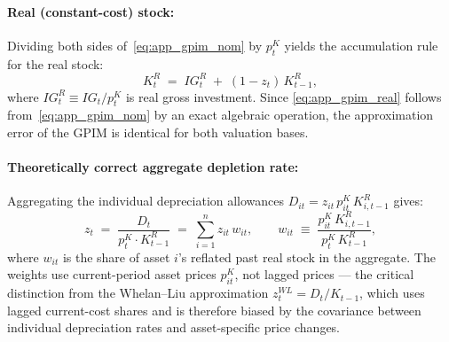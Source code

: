 \paragraph{Real (constant-cost) stock:}
Dividing both sides of~\eqref{eq:app_gpim_nom} by $p_t^{K}$ yields the
accumulation rule for the real stock:
%
\begin{equation}
  \label{eq:app_gpim_real}
  K_t^{R} \;=\; IG_t^{R} \;+\; (1 - z_t)\,K_{t-1}^{R},
\end{equation}
%
where $IG_t^{R} \equiv IG_t/p_t^{K}$ is real gross investment. Since
\eqref{eq:app_gpim_real} follows from~\eqref{eq:app_gpim_nom} by an
exact algebraic operation, the approximation error of the GPIM is
identical for both valuation bases.

\paragraph{Theoretically correct aggregate depletion rate:}
Aggregating the individual depreciation allowances
$D_{it} = z_{it}\,p_{it}^{K}\,K_{i,t-1}^{R}$ gives:
%
\begin{equation}
  \label{eq:app_dep_rate}
  z_t \;=\; \frac{D_t}{p_t^{K}\cdot K_{t-1}^{R}}
  \;=\; \sum_{i=1}^{n} z_{it}\,w_{it},
  \qquad
  w_{it} \;\equiv\;
  \frac{p_{it}^{K}\,K_{i,t-1}^{R}}{p_t^{K}\,K_{t-1}^{R}},
\end{equation}
%
where $w_{it}$ is the share of asset $i$'s reflated past real stock in
the aggregate. The weights use current-period asset prices $p_{it}^{K}$,
not lagged prices --- the critical distinction from the
Whelan--Liu approximation $z_t^{WL} = D_t/K_{t-1}$, which uses lagged
current-cost shares and is therefore biased by the covariance between
individual depreciation rates and asset-specific price changes.

